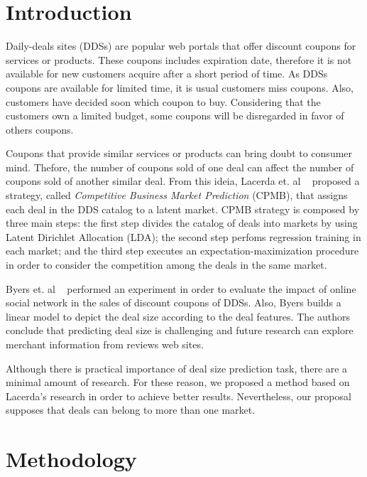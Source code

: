 \documentclass{acm_proc_article-sp}
\begin{document}


\section{Introduction}

Daily-deals sites (DDSs) are popular web portals that offer discount coupons 
for services or products. These coupons includes expiration date, therefore 
it is not available for new customers acquire after a short period of time. 
As DDSs coupons are available for limited time, it is usual customers 
miss coupons. Also, customers have decided soon which coupon to buy. 
Considering that the customers own a limited budget, some coupons 
will be disregarded in favor of others coupons.

Coupons that provide similar services or products can bring doubt to 
consumer mind. Thefore, the number of coupons sold of one deal  
can affect the number of coupons sold of another similar deal. From this ideia, 
Lacerda et. al ~\cite{lacerda2014context} proposed a 
strategy, called \emph{Competitive Business Market Prediction} 
(CPMB),
that assigns each deal in the DDS catalog to a latent 
market. CPMB strategy is composed by three main steps:
the first step divides the catalog of deals into markets 
by using Latent Dirichlet Allocation (LDA); the second step perfoms 
regression training in each market; and the third step executes an 
expectation-maximization  procedure in order to consider the 
competition among the deals in the same market.

Byers et. al ~\cite{BMZ12} performed an experiment in order to evaluate 
the impact of online social network in the sales of discount coupons 
of DDSs. Also, Byers builds a linear model to depict the deal size 
according to the deal features. The authors conclude that predicting 
deal size is challenging and future research can explore merchant information 
from reviews web sites.

Although there is practical importance of deal size prediction task, 
there are a minimal amount of research. For these reason, we proposed 
a method based on Lacerda's research in order to achieve better results. 
Nevertheless, our proposal supposes that deals can belong to more than 
one market. %

\section{Methodology}
\end{document}
